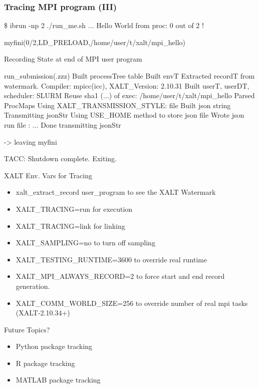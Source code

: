 \documentclass{beamer}
\begin{document}
\begin{frame}[fragile]
    \frametitle{Tracing MPI program (III)}
 {\tiny
    \begin{semiverbatim}
\$ ibrun -np 2 ./run\_me.sh
...
Hello World from proc: 0 out of 2 !

myfini(0/2,LD\_PRELOAD,/home/user/t/xalt/mpi\_hello){
  Recording State at end of MPI user program

  run\_submission(.zzz) {
    Built processTree table
    Built envT
    Extracted recordT from watermark. Compiler: mpicc(icc), XALT\_Version: 2.10.31
    Built userT, userDT, scheduler: SLURM
    Reuse   sha1 (...) of exec: /home/user/t/xalt/mpi\_hello
    Parsed ProcMaps
    Using XALT\_TRANSMISSION\_STYLE: file
    Built json string
    Transmitting jsonStr
    Using USE\_HOME method to store json file
    Wrote json run file : ...
    Done transmitting jsonStr
  }

    -> leaving myfini
}

TACC:  Shutdown complete. Exiting. 
\end{semiverbatim}
}
\end{frame}


\begin{frame}{XALT Env. Vars for Tracing}
  \begin{itemize}
    \item xalt\_extract\_record user\_program to see the XALT Watermark
    \item XALT\_TRACING=run for execution
    \item XALT\_TRACING=link for linking
    \item XALT\_SAMPLING=no to turn off sampling
    \item XALT\_TESTING\_RUNTIME=3600 to override real runtime
    \item XALT\_MPI\_ALWAYS\_RECORD=2 to force start and end record generation.
    \item XALT\_COMM\_WORLD\_SIZE=256 to override number of real mpi tasks
      (XALT-2.10.34+)
  \end{itemize}
\end{frame}


\begin{frame}{Future Topics?} 
  \begin{itemize}
    \item Python package tracking
    \item R package tracking
    \item MATLAB package tracking
  \end{itemize}
\end{frame}
%

%
\end{document}

